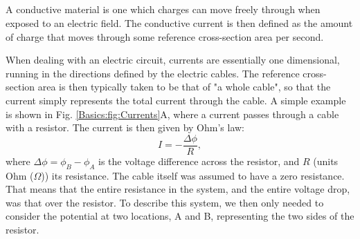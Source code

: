 \subsection{}
A conductive material   is one which charges can move freely through when exposed to an electric field. The conductive current is then defined as the amount of charge that moves through some reference cross-section area per second. 

When dealing with an electric circuit, currents are essentially one dimensional, running in the directions defined by the electric cables. The reference cross-section area is then typically taken to be that of "a whole cable", so that the current simply represents the total current through the cable. A simple example is shown in Fig. \ref{Basics:fig:Currents}A, where a current passes through a cable with a resistor. The current is then given by Ohm's law:
\begin{equation}
I = - \frac{\Delta \phi}{R}, 
\label{Basics:eq:Ohm_R}
\end{equation}
where $\Delta \phi = \phi_B-\phi_A$ is the voltage difference across the resistor, and $R$ (units Ohm ($\Omega$)) its resistance. The cable itself was assumed to have a zero resistance. That means that the entire resistance in the system, and the entire voltage drop, was that over the resistor. To describe this system, we then only needed to consider the potential at two locations, A and B, representing the two sides of the resistor. 

